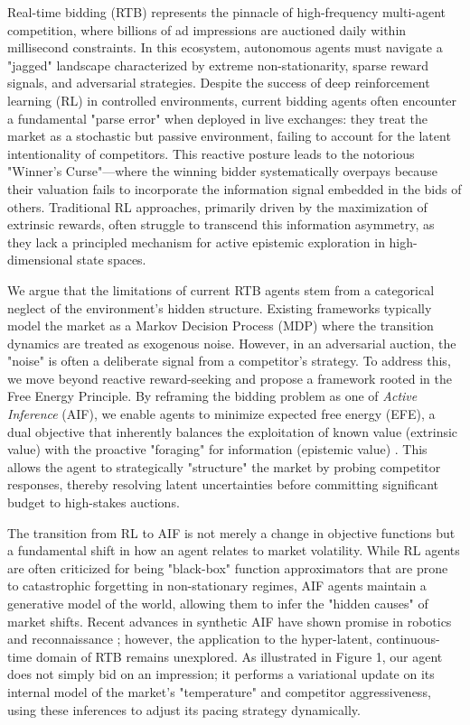 Real-time bidding (RTB) represents the pinnacle of high-frequency multi-agent competition, where billions of ad impressions are auctioned daily within millisecond constraints. In this ecosystem, autonomous agents must navigate a "jagged" landscape characterized by extreme non-stationarity, sparse reward signals, and adversarial strategies. Despite the success of deep reinforcement learning (RL) in controlled environments, current bidding agents often encounter a fundamental "parse error" when deployed in live exchanges: they treat the market as a stochastic but passive environment, failing to account for the latent intentionality of competitors. This reactive posture leads to the notorious "Winner's Curse"—where the winning bidder systematically overpays because their valuation fails to incorporate the information signal embedded in the bids of others. Traditional RL approaches, primarily driven by the maximization of extrinsic rewards, often struggle to transcend this information asymmetry, as they lack a principled mechanism for active epistemic exploration in high-dimensional state spaces.

We argue that the limitations of current RTB agents stem from a categorical neglect of the environment's hidden structure. Existing frameworks typically model the market as a Markov Decision Process (MDP) where the transition dynamics are treated as exogenous noise. However, in an adversarial auction, the "noise" is often a deliberate signal from a competitor's strategy. To address this, we move beyond reactive reward-seeking and propose a framework rooted in the Free Energy Principle. By reframing the bidding problem as one of \textit{Active Inference} (AIF), we enable agents to minimize expected free energy (EFE), a dual objective that inherently balances the exploitation of known value (extrinsic value) with the proactive "foraging" for information (epistemic value) \cite{ref_new_TheMissingRewar}. This allows the agent to strategically "structure" the market by probing competitor responses, thereby resolving latent uncertainties before committing significant budget to high-stakes auctions.

The transition from RL to AIF is not merely a change in objective functions but a fundamental shift in how an agent relates to market volatility. While RL agents are often criticized for being "black-box" function approximators that are prone to catastrophic forgetting in non-stationary regimes, AIF agents maintain a generative model of the world, allowing them to infer the "hidden causes" of market shifts. Recent advances in synthetic AIF have shown promise in robotics and reconnaissance \cite{ref_new_ActiveInference}; however, the application to the hyper-latent, continuous-time domain of RTB remains unexplored. As illustrated in Figure 1, our agent does not simply bid on an impression; it performs a variational update on its internal model of the market's "temperature" and competitor aggressiveness, using these inferences to adjust its pacing strategy dynamically.

